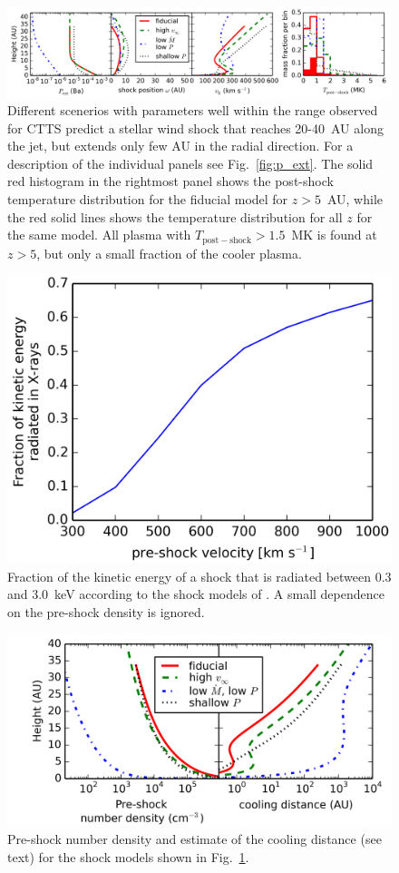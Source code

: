 \documentclass[manuscript]{aastex}
\begin{document}
\begin{figure}[h!]
\begin{center}
\includegraphics[width=1\columnwidth]{figures/result/result.png}
\caption{\label{fig:result}
Different scenerios with parameters well within the range observed for CTTS predict a stellar wind shock that reaches 20-40~AU along the jet, but extends only few AU in the radial direction. For a description of the individual panels see Fig.~\ref{fig:p_ext}. The solid red histogram in the rightmost panel shows the post-shock temperature distribution for the fiducial model for $z>5$~AU, while the red solid lines shows the temperature distribution for all $z$ for the same model. All plasma with $T_{\mathrm{post-shock}}>1.5$~MK is found at $z>5$, but only a small fraction of the cooler plasma.}
\end{center}
\end{figure}

\begin{figure}[h!]
\begin{center}
\includegraphics[width=0.7\columnwidth]{figures/fracxray/fracxray.png}
\caption{\label{fig:fracxray}
Fraction of the kinetic energy of a shock that is radiated between 0.3 and 3.0~keV according to the shock models of . A small dependence on the pre-shock density is ignored.
}
\end{center}
\end{figure}

\begin{figure}[h!]
\begin{center}
\includegraphics[width=0.42\columnwidth]{figures/rhocool/rhocool.png}
\caption{\label{fig:rhocool}
Pre-shock number density and estimate of the cooling distance (see text) for the shock models shown in Fig.~\ref{fig:result}.}
\end{center}
\end{figure}
\end{document}
